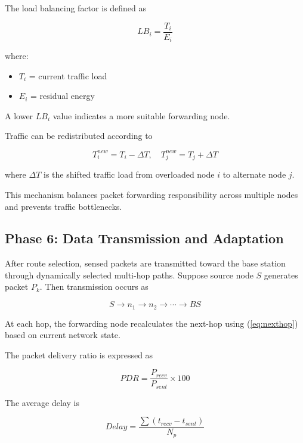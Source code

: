 \documentclass[a4paper,fleqn]{cas-dc}
\numberwithin{equation}{section}
\begin{document}
The load balancing factor is defined as

\begin{equation}
\label{eq:lb}
LB_i=\frac{T_i}{E_i}
\end{equation}

where:

\begin{itemize}
\item $T_i$ = current traffic load
\item $E_i$ = residual energy
\end{itemize}

A lower $LB_i$ value indicates a more suitable forwarding node.

Traffic can be redistributed according to

\begin{equation}
T_i^{new}=T_i-\Delta T,\quad T_j^{new}=T_j+\Delta T
\end{equation}

where $\Delta T$ is the shifted traffic load from overloaded node $i$ to alternate node $j$.

This mechanism balances packet forwarding responsibility across multiple nodes and prevents traffic bottlenecks.

\subsection{Phase 6: Data Transmission and Adaptation}

After route selection, sensed packets are transmitted toward the base station through dynamically selected multi-hop paths. Suppose source node $S$ generates packet $P_k$. Then transmission occurs as

\begin{equation}
S \rightarrow n_1 \rightarrow n_2 \rightarrow \cdots \rightarrow BS
\end{equation}

At each hop, the forwarding node recalculates the next-hop using (\ref{eq:nexthop}) based on current network state.

The packet delivery ratio is expressed as

\begin{equation}
PDR=\frac{P_{recv}}{P_{sent}}\times 100
\end{equation}

The average delay is

\begin{equation}
Delay=\frac{\sum (t_{recv}-t_{sent})}{N_p}
\end{equation}
\end{document}
